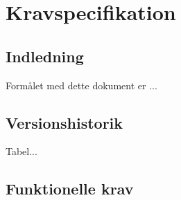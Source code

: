 \chapter{Kravspecifikation}

\section{Indledning}
Formålet med dette dokument er ...
\section{Versionshistorik}
Tabel...

\section{Funktionelle krav}
